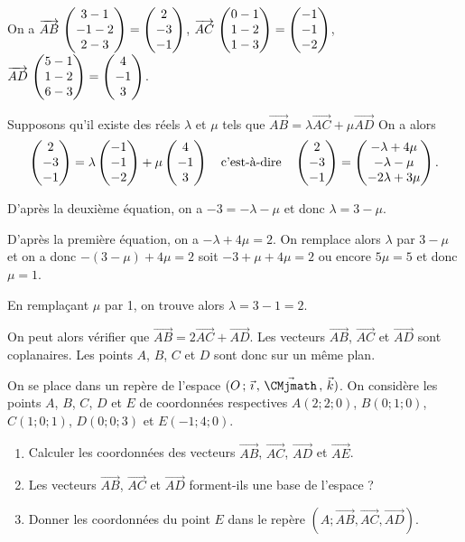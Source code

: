 \documentclass[11pt,fleqn, openany]{book} %
\begin{document}
\begin{solution}On a $\coorde{AB}{3-1}{-1-2}{2-3}=\coordbe{2}{-3}{-1}$, $\coorde{AC}{0-1}{1-2}{1-3}=\coordbe{-1}{-1}{-2}$, $\coorde{AD}{5-1}{1-2}{6-3}=\coordbe{4}{-1}{3}$.

Supposons qu'il existe des réels $\lambda$ et $\mu$ tels que $\overrightarrow{AB}=\lambda \overrightarrow{AC}+\mu \overrightarrow{AD}$ On a alors
\[ \coordbe{2}{-3}{-1}=\lambda\coordbe{-1}{-1}{-2}+\mu \coordbe{4}{-1}{3} \quad \text{c'est-à-dire}\quad \coordbe{2}{-3}{-1} = \coordbe{-\lambda+4\mu}{-\lambda-\mu}{-2\lambda+3\mu}.\]

D'après la deuxième équation, on a $-3=-\lambda-\mu$ et donc $\lambda = 3-\mu$.

D'après la première équation, on a $-\lambda +4\mu = 2$. On remplace alors $\lambda$ par $3-\mu$ et on a donc $-(3-\mu)+4\mu=2$ soit $-3+\mu+4\mu=2$ ou encore $5\mu = 5$ et donc $\mu=1$.

En remplaçant $\mu$ par 1, on trouve alors $\lambda = 3-1=2$.

On peut alors vérifier que $\overrightarrow{AB}=2\overrightarrow{AC}+\overrightarrow{AD}$. Les vecteurs $\overrightarrow{AB}$, $\overrightarrow{AC}$ et $\overrightarrow{AD}$ sont coplanaires. Les points $A$, $B$, $C$ et $D$ sont donc sur un même plan.\end{solution}





\begin{exercise}[topic=geo03]On se place dans un repère de l'espace $\Oijk$. On considère les points $A$, $B$, $C$, $D$ et $E$ de coordonnées respectives $A(2;2;0)$, $B(0;1;0)$, $C(1;0;1)$, $D(0;0;3)$ et $E(-1;4;0)$.
\begin{enumerate}
\item Calculer les coordonnées des vecteurs $\overrightarrow{AB}$, $\overrightarrow{AC}$, $\overrightarrow{AD}$ et $\overrightarrow{AE}$.
\item Les vecteurs $\overrightarrow{AB}$, $\overrightarrow{AC}$ et $\overrightarrow{AD}$ forment-ils une base de l'espace ?
\item Donner les coordonnées du point $E$ dans le repère $(A;\overrightarrow{AB},\overrightarrow{AC},\overrightarrow{AD})$.
\end{enumerate}\end{exercise}
\end{document}
